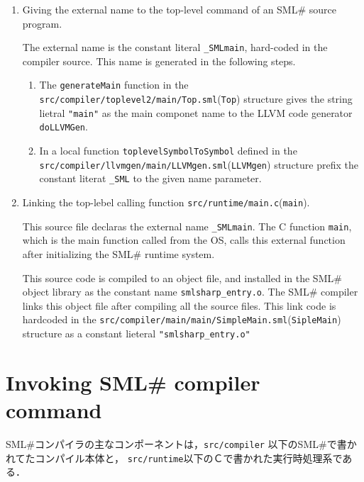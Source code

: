 \documentclass{jbook}
\newif\ifjp
\newcommand{\txt}[2]{#2}
\newcommand{\smlsharp}{SML\#}
\newcommand{\code}[1]{\mbox{\large\tt #1}}
\newcommand{\module}[2]{\code{#1}(\code{#2})}
\begin{document}
\begin{enumerate}
\item Giving the external name to the top-level command of an
\smlsharp{} source program.

	The external name is the constant literal \code{\_SMLmain},
hard-coded in the compiler source.
	This name is generated in the following steps.
\begin{enumerate}
\item The \code{generateMain} function in the 
\module{src/compiler/toplevel2/main/Top.sml}{Top}
structure gives the string lietral \code{"main"} as
the main componet name to the LLVM code generator 
\code{doLLVMGen}.
\item 
	In a local function \code{toplevelSymbolToSymbol} defined
in the \module{src/compiler/llvmgen/main/LLVMgen.sml}{LLVMgen} structure
prefix the constant literat \code{\_SML} to the given name parameter.
\end{enumerate}

\item Linking the top-lebel calling function \module{src/runtime/main.c}{main}.

	This source file declaras the external name \code{\_SMLmain}.
	The C function \code{main}, which is the main function called
from the OS, calls this external function after initializing 
the \smlsharp{} runtime system.

	This source code is compiled to an object file, 
and installed in the \smlsharp{} object library as the constant name
\code{smlsharp\_entry.o}.
	The \smlsharp{} compiler links this object file after compiling
all the source files.
	This link code is hardcoded in the
\module{src/compiler/main/main/SimpleMain.sml}{SipleMain}
structure as a constant lieteral \code{"smlsharp\_entry.o"}
\end{enumerate}
\fi%

\section{\txt{\smlsharp{}コンパイラコマンドの起動}{Invoking \smlsharp{} compiler command}}

\ifjp%
	\smlsharp{}コンパイラの主なコンポーネントは，\code{src/compiler}
以下の\smlsharp{}で書かれてたコンパイル本体と，
\code{src/runtime}以下のＣで書かれた実行時処理系である．
	
\end{document}
